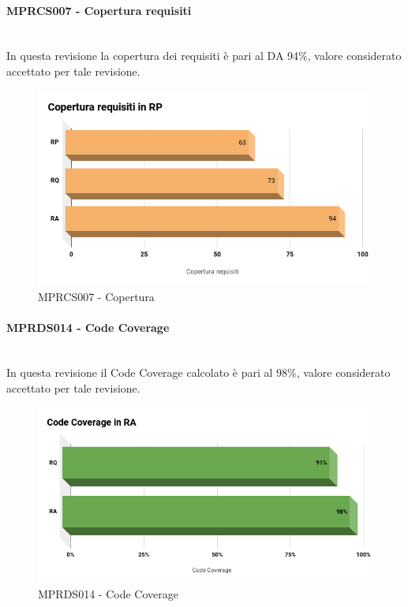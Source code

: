 \paragraph{MPRCS007 - Copertura requisiti}\mbox{}\\[0.4cm]
In questa revisione la copertura dei requisiti è pari al DA 94\%, valore considerato accettato per tale revisione.
\begin{figure}[H]
	\centering
	\includegraphics[width=13cm,keepaspectratio]{../includes/pics/CoperturaRP_RA.png}
	\caption{\label{fig:mission}MPRCS007 - Copertura}
\end{figure}
\paragraph{MPRDS014 - Code Coverage}\mbox{}\\[0.4cm]
\label{sec:CCRA}
In questa revisione il Code Coverage calcolato è pari al 98\%, valore considerato accettato per tale revisione.
\begin{figure}[H]
	\centering
	\includegraphics[width=13cm,keepaspectratio]{../includes/pics/ccRA.png}
	\caption{\label{fig:mission}MPRDS014 - Code Coverage}
\end{figure}